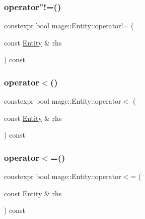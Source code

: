 \mbox{\label{classmage_1_1_entity_ac18c76ad9c3f5e42ada9451e1b83f7cd}} 
\subsubsection{\texorpdfstring{operator"!=()}{operator!=()}}
{\footnotesize\ttfamily constexpr bool mage\+::\+Entity\+::operator!= (\begin{DoxyParamCaption}\item[{const \mbox{\hyperlink{classmage_1_1_entity}{Entity}} \&}]{rhs }\end{DoxyParamCaption}) const\hspace{0.3cm}{\ttfamily [noexcept]}}

\mbox{\label{classmage_1_1_entity_a89fb7b21e5e82dce72f68aed4f1b1233}} 
\subsubsection{\texorpdfstring{operator$<$()}{operator<()}}
{\footnotesize\ttfamily constexpr bool mage\+::\+Entity\+::operator$<$ (\begin{DoxyParamCaption}\item[{const \mbox{\hyperlink{classmage_1_1_entity}{Entity}} \&}]{rhs }\end{DoxyParamCaption}) const\hspace{0.3cm}{\ttfamily [noexcept]}}

\mbox{\label{classmage_1_1_entity_a01b27c58e6ee9241dfcecfe65c6958c4}} 
\subsubsection{\texorpdfstring{operator$<$=()}{operator<=()}}
{\footnotesize\ttfamily constexpr bool mage\+::\+Entity\+::operator$<$= (\begin{DoxyParamCaption}\item[{const \mbox{\hyperlink{classmage_1_1_entity}{Entity}} \&}]{rhs }\end{DoxyParamCaption}) const\hspace{0.3cm}{\ttfamily [noexcept]}}

